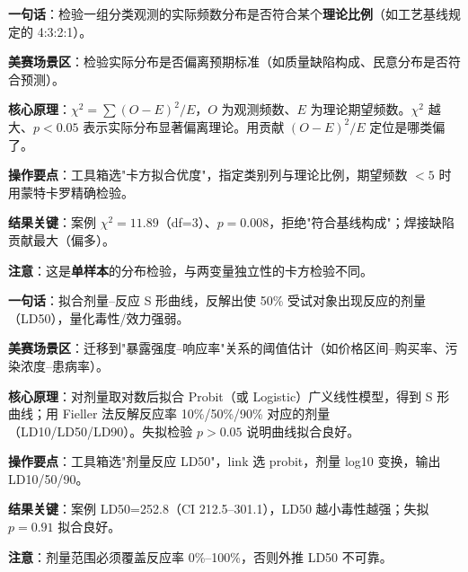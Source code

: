 
\begin{algobrief}
\textbf{一句话}：检验一组分类观测的实际频数分布是否符合某个\textbf{理论比例}（如工艺基线规定的 4:3:2:1）。

\textbf{美赛场景区}：检验实际分布是否偏离预期标准（如质量缺陷构成、民意分布是否符合预测）。

\textbf{核心原理}：$\chi^2 = \sum (O-E)^2/E$，$O$ 为观测频数、$E$ 为理论期望频数。$\chi^2$ 越大、$p<0.05$ 表示实际分布显著偏离理论。用贡献 $(O-E)^2/E$ 定位是哪类偏了。

\textbf{操作要点}：工具箱选"卡方拟合优度"，指定类别列与理论比例，期望频数 $<5$ 时用蒙特卡罗精确检验。

\textbf{结果关键}：案例 $\chi^2=11.89$（df=3）、$p=0.008$，拒绝"符合基线构成"；焊接缺陷贡献最大（偏多）。

\textbf{注意}：这是\textbf{单样本}的分布检验，与两变量独立性的卡方检验不同。
\end{algobrief}


\begin{algobrief}
\textbf{一句话}：拟合剂量--反应 S 形曲线，反解出使 50\% 受试对象出现反应的剂量（LD50），量化毒性/效力强弱。

\textbf{美赛场景区}：迁移到"暴露强度--响应率"关系的阈值估计（如价格区间--购买率、污染浓度--患病率）。

\textbf{核心原理}：对剂量取对数后拟合 Probit（或 Logistic）广义线性模型，得到 S 形曲线；用 Fieller 法反解反应率 10\%/50\%/90\% 对应的剂量（LD10/LD50/LD90）。失拟检验 $p>0.05$ 说明曲线拟合良好。

\textbf{操作要点}：工具箱选"剂量反应 LD50"，link 选 probit，剂量 log10 变换，输出 LD10/50/90。

\textbf{结果关键}：案例 LD50=252.8（CI 212.5--301.1），LD50 越小毒性越强；失拟 $p=0.91$ 拟合良好。

\textbf{注意}：剂量范围必须覆盖反应率 0\%--100\%，否则外推 LD50 不可靠。
\end{algobrief}